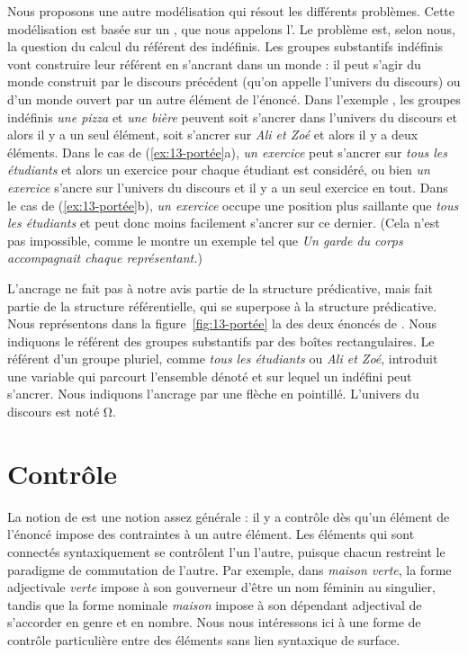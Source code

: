 {Nous proposons une autre modélisation qui résout les différents problèmes. Cette modélisation est basée sur un , que nous appelons l’. Le problème est, selon nous, la question du calcul du référent des indéfinis. Les groupes substantifs indéfinis vont construire leur référent en s’ancrant dans un monde : il peut s’agir du monde construit par le discours précédent (qu’on appelle l’univers du discours) ou d’un monde ouvert par un autre élément de l’énoncé. Dans l’exemple , les groupes indéfinis \textit{une pizza} et \textit{une bière} peuvent soit s’ancrer dans l’univers du discours et alors il y a un seul élément, soit s’ancrer sur \textit{Ali et Zoé} et alors il y a deux éléments. Dans le cas de (\ref{ex:13-portée}a), \textit{un exercice} peut s’ancrer sur \textit{tous les étudiants} et alors un exercice pour chaque étudiant est considéré, ou bien \textit{un exercice} s’ancre sur l’univers du discours et il y a un seul exercice en tout. Dans le cas de (\ref{ex:13-portée}b), \textit{un exercice} occupe une position plus saillante que \textit{tous les étudiants} et peut donc moins facilement s’ancrer sur ce dernier. (Cela n’est pas impossible, comme le montre un exemple tel que \textit{Un garde du corps accompagnait chaque représentant.}) 

L’ancrage ne fait pas à notre avis partie de la structure prédicative, mais fait partie de la structure référentielle, qui se superpose à la structure prédicative. Nous représentons dans la figure~\ref{fig:13-portée} la  des deux énoncés de . Nous indiquons le référent des groupes substantifs par des boîtes rectangulaires. Le référent d’un groupe pluriel, comme \textit{tous les étudiants} ou \textit{Ali et Zoé}, introduit une variable qui parcourt l’ensemble dénoté et sur lequel un indéfini peut s’ancrer. Nous indiquons l’ancrage par une flèche en pointillé. L’univers du discours est noté Ω.}

\section{Contrôle}
\label{sec:13-controle}
La notion de  est une notion assez générale : il y a contrôle dès qu’un élément de l’énoncé impose des contraintes à un autre élément. Les éléments qui sont connectés syntaxiquement se contrôlent l’un l’autre, puisque chacun restreint le paradigme de commutation de l’autre. Par exemple, dans \textit{maison verte}, la forme adjectivale \textit{verte} impose à son gouverneur d’être un nom féminin au singulier, tandis que la forme nominale \textit{maison} impose à son dépendant adjectival de s’accorder en genre et en nombre. Nous nous intéressons ici à une forme de contrôle particulière entre des éléments sans lien syntaxique de surface.

